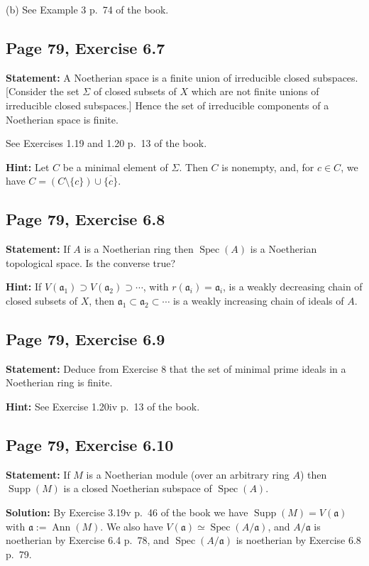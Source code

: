 \documentclass[parskip=half,fontsize=12pt]{scrartcl}%
\newcommand{\oo}{\operatorname}\newcommand{\ooo}{\operatorname*}
\newcommand{\mf}{\mathfrak}
\newcommand{\aaa}{\mf a}
\newcommand{\Spec}{\operatorname{Spec}}\newcommand{\Sp}{\operatorname{Spec}}
\begin{document}
(b) See Example 3 p.~74 of the book. 

\subsection{Page 79, Exercise 6.7}%

\textbf{Statement:} A Noetherian space is a finite union of irreducible closed subspaces. [Consider the set $\Sigma$ of closed subsets of $X$ which are not finite unions of irreducible closed subspaces.] Hence the set of irreducible components of a Noetherian space is finite.

See Exercises 1.19 and 1.20 p.~13 of the book. 

\textbf{Hint:} Let $C$ be a minimal element of $\Sigma$. Then $C$ is nonempty, and, for $c\in C$, we have $C=(C\setminus\{c\})\cup\overline{\{c\}}$. 

\subsection{Page 79, Exercise 6.8}%

\textbf{Statement:} If $A$ is a Noetherian ring then $\Spec(A)$ is a Noetherian topological space. Is the converse true?

\textbf{Hint:} If $V(\aaa_1)\supset V(\aaa_2)\supset\cdots$, with $r(\aaa_i)=\aaa_i$, is a weakly decreasing chain of closed subsets of $X$, then $\aaa_1\subset\aaa_2\subset\cdots$ is a weakly increasing chain of ideals of $A$. 

\subsection{Page 79, Exercise 6.9}%

\textbf{Statement:} Deduce from Exercise 8 that the set of minimal prime ideals in a Noetherian ring is finite.

\textbf{Hint:} See Exercise 1.20iv p.~13 of the book.

\subsection{Page 79, Exercise 6.10}%

\textbf{Statement:} If $M$ is a Noetherian module (over an arbitrary ring $A$) then $\oo{Supp}(M)$ is a closed Noetherian subspace of $\Spec(A)$.

\textbf{Solution:} By Exercise 3.19v p.~46 of the book we have $\oo{Supp}(M)=V(\aaa)$ with $\aaa:=\oo{Ann}(M)$. We also have $V(\aaa)\simeq\Spec(A/\aaa)$, and $A/\aaa$ is noetherian by Exercise 6.4 p.~78, and $\Spec(A/\aaa)$ is noetherian by Exercise 6.8 p.~79. 
\end{document}
